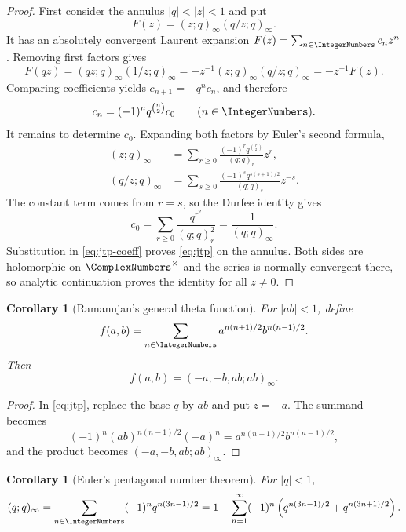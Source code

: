 \documentclass[11pt]{article}
\theoremstyle{blueplain}
\newtheorem{corollary}[theorem]{Corollary}
\theoremstyle{bluedef}
\begin{document}
\begin{proof}
First consider the annulus $|q|<|z|<1$ and put
\[
F(z)=(z;q)_\infty(q/z;q)_\infty.
\]
It has an absolutely convergent Laurent expansion $F(z)=\sum_{n\in\IntegerNumbers}c_nz^n$.  Removing first factors gives
\[
F(qz)=(qz;q)_\infty(1/z;q)_\infty
=-z^{-1}(z;q)_\infty(q/z;q)_\infty=-z^{-1}F(z).
\]
Comparing coefficients yields $c_{n+1}=-q^nc_n$, and therefore
\begin{equation}\label{eq:jtp-coeff}
c_n=(-1)^nq^{\binom n2}c_0\qquad(n\in\IntegerNumbers).
\end{equation}
It remains to determine $c_0$.  Expanding both factors by Euler's second formula,
\begin{align*}
(z;q)_\infty
 &=\sum_{r\ge0}\frac{(-1)^rq^{\binom r2}}{(q;q)_r}z^r,\\
(q/z;q)_\infty
 &=\sum_{s\ge0}\frac{(-1)^sq^{s(s+1)/2}}{(q;q)_s}z^{-s}.
\end{align*}
The constant term comes from $r=s$, so the Durfee identity gives
\[
c_0=\sum_{r\ge0}\frac{q^{r^2}}{(q;q)_r^2}=\frac1{(q;q)_\infty}.
\]
Substitution in \eqref{eq:jtp-coeff} proves \eqref{eq:jtp} on the annulus.  Both sides are holomorphic on $\ComplexNumbers^\times$ and the series is normally convergent there, so analytic continuation proves the identity for all $z\ne0$.
\end{proof}

\begin{corollary}[Ramanujan's general theta function]\label{cor:ramanujan-theta}
For $|ab|<1$, define
\[
f(a,b)=\sum_{n\in\IntegerNumbers}a^{n(n+1)/2}b^{n(n-1)/2}.
\]
Then
\begin{equation}\label{eq:ramanujan-theta}
f(a,b)=(-a,-b,ab;ab)_\infty.
\end{equation}
\end{corollary}

\begin{proof}
In \eqref{eq:jtp}, replace the base $q$ by $ab$ and put $z=-a$.  The summand becomes
\[
(-1)^n(ab)^{n(n-1)/2}(-a)^n
=a^{n(n+1)/2}b^{n(n-1)/2},
\]
and the product becomes $(-a,-b,ab;ab)_\infty$.
\end{proof}

\begin{corollary}[Euler's pentagonal number theorem]\label{cor:pentagonal}
For $|q|<1$,
\begin{equation}\label{eq:pentagonal}
(q;q)_\infty
=\sum_{n\in\IntegerNumbers}(-1)^nq^{n(3n-1)/2}
=1+\sum_{n=1}^{\infty}(-1)^n
 \left(q^{n(3n-1)/2}+q^{n(3n+1)/2}\right).
\end{equation}
\end{corollary}
\end{document}
